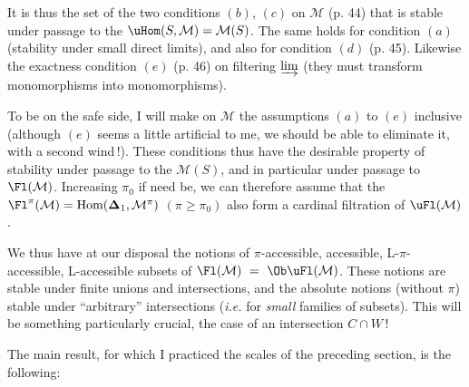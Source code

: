 It is thus the set of the two conditions $(b)$, $(c)$ on $\mathcal{M}$ (p. 44) that is stable under passage to the $\uHom(S,\mathcal{M}) = \mathcal{M}(S)$. The same holds for condition $(a)$ (stability under small direct limits), and also for condition
$(d)$ (p. 45). Likewise the exactness condition $(e)$ (p. 46) on filtering $\varinjlim$ (they must transform monomorphisms into monomorphisms).

To be on the safe side, I will make on $\mathcal{M}$ the assumptions $(a)$ to $(e)$ inclusive (although $(e)$ seems a little artificial to me, we should be able to eliminate it, with a second wind\,!). These conditions thus have the desirable property of stability under passage to the $\mathcal{M}(S)$, and in particular under passage to $\Fl(\mathcal{M})$. Increasing $\pi_{0}$ if need be, we can therefore assume that the $\Fl^{\pi}(\mathcal{M}) = \mathrm{Hom}(\boldsymbol{\Delta}_{1},\mathcal{M}^{\pi})$ $(\pi \geq \pi_{0})$ also form a cardinal filtration of $\uFl(\mathcal{M})$.

We thus have at our disposal the notions of $\pi$-accessible, accessible, L-$\pi$-accessible, L-accessible subsets of $\Fl(\mathcal{M}) \ = \ \Ob\uFl(\mathcal{M})$. These notions are stable under finite unions and intersections, and the absolute notions (without $\pi$) stable under ``arbitrary'' intersections (\textit{i.e.} for \textit{small} families of subsets). This will be something particularly%
crucial, the case of an intersection $C \cap W$\,!

The main result, for which I practiced the scales of the preceding section, is the following:

